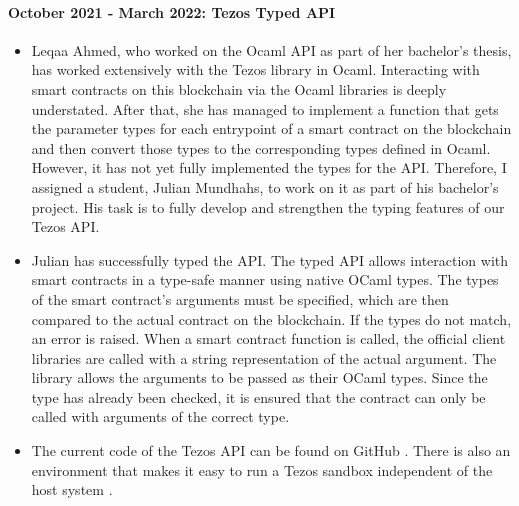 \documentclass[a4paper,11pt]{article}
\begin{document}
\paragraph{October 2021 - March 2022:  Tezos Typed API} 
\begin{itemize}
\item Leqaa Ahmed, who worked on the Ocaml API as part of her bachelor's thesis, has worked extensively with the Tezos library in Ocaml. Interacting with smart contracts on this blockchain via the Ocaml libraries is deeply understated. After that, she has managed to implement a function that gets the parameter types for each entrypoint of a smart contract on the blockchain and then convert those types to the corresponding types defined in Ocaml. However, it has not yet fully implemented the types for the API. Therefore, I assigned a student, Julian Mundhahs, to work on it as part of his bachelor's project. His task is to fully develop and strengthen the typing features of our Tezos API.
\item Julian has successfully typed the API. The typed API allows interaction with smart contracts in a type-safe manner using native OCaml types. The types of the smart contract's arguments must be specified, which are then compared to the actual contract on the blockchain. If the types do not match, an error is raised. When a smart contract function is called, the official client libraries are called with a string representation of the actual argument. The library allows the arguments to be passed as their OCaml types. Since the type has already been checked, it is ensured that the contract can only be called with arguments of the correct type. 
\item  The current code of the Tezos API can be found on GitHub \cite{tezos-api-update}. There is also an environment that makes it easy to run a Tezos sandbox independent of the host system \cite{tezos-api-devenv}.
\end{itemize}
 
\end{document}
